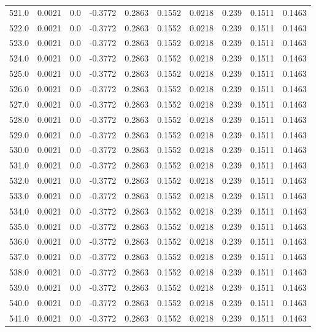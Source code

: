 \begin{longtable}{lrrrrrrrrr}
521.0 & 0.0021 & 0.0 & -0.3772 & 0.2863 & 0.1552 & 0.0218 & 0.239 & 0.1511 & 0.1463 \\
522.0 & 0.0021 & 0.0 & -0.3772 & 0.2863 & 0.1552 & 0.0218 & 0.239 & 0.1511 & 0.1463 \\
523.0 & 0.0021 & 0.0 & -0.3772 & 0.2863 & 0.1552 & 0.0218 & 0.239 & 0.1511 & 0.1463 \\
524.0 & 0.0021 & 0.0 & -0.3772 & 0.2863 & 0.1552 & 0.0218 & 0.239 & 0.1511 & 0.1463 \\
525.0 & 0.0021 & 0.0 & -0.3772 & 0.2863 & 0.1552 & 0.0218 & 0.239 & 0.1511 & 0.1463 \\
526.0 & 0.0021 & 0.0 & -0.3772 & 0.2863 & 0.1552 & 0.0218 & 0.239 & 0.1511 & 0.1463 \\
527.0 & 0.0021 & 0.0 & -0.3772 & 0.2863 & 0.1552 & 0.0218 & 0.239 & 0.1511 & 0.1463 \\
528.0 & 0.0021 & 0.0 & -0.3772 & 0.2863 & 0.1552 & 0.0218 & 0.239 & 0.1511 & 0.1463 \\
529.0 & 0.0021 & 0.0 & -0.3772 & 0.2863 & 0.1552 & 0.0218 & 0.239 & 0.1511 & 0.1463 \\
530.0 & 0.0021 & 0.0 & -0.3772 & 0.2863 & 0.1552 & 0.0218 & 0.239 & 0.1511 & 0.1463 \\
531.0 & 0.0021 & 0.0 & -0.3772 & 0.2863 & 0.1552 & 0.0218 & 0.239 & 0.1511 & 0.1463 \\
532.0 & 0.0021 & 0.0 & -0.3772 & 0.2863 & 0.1552 & 0.0218 & 0.239 & 0.1511 & 0.1463 \\
533.0 & 0.0021 & 0.0 & -0.3772 & 0.2863 & 0.1552 & 0.0218 & 0.239 & 0.1511 & 0.1463 \\
534.0 & 0.0021 & 0.0 & -0.3772 & 0.2863 & 0.1552 & 0.0218 & 0.239 & 0.1511 & 0.1463 \\
535.0 & 0.0021 & 0.0 & -0.3772 & 0.2863 & 0.1552 & 0.0218 & 0.239 & 0.1511 & 0.1463 \\
536.0 & 0.0021 & 0.0 & -0.3772 & 0.2863 & 0.1552 & 0.0218 & 0.239 & 0.1511 & 0.1463 \\
537.0 & 0.0021 & 0.0 & -0.3772 & 0.2863 & 0.1552 & 0.0218 & 0.239 & 0.1511 & 0.1463 \\
538.0 & 0.0021 & 0.0 & -0.3772 & 0.2863 & 0.1552 & 0.0218 & 0.239 & 0.1511 & 0.1463 \\
539.0 & 0.0021 & 0.0 & -0.3772 & 0.2863 & 0.1552 & 0.0218 & 0.239 & 0.1511 & 0.1463 \\
540.0 & 0.0021 & 0.0 & -0.3772 & 0.2863 & 0.1552 & 0.0218 & 0.239 & 0.1511 & 0.1463 \\
541.0 & 0.0021 & 0.0 & -0.3772 & 0.2863 & 0.1552 & 0.0218 & 0.239 & 0.1511 & 0.1463 \\

\end{longtable}

